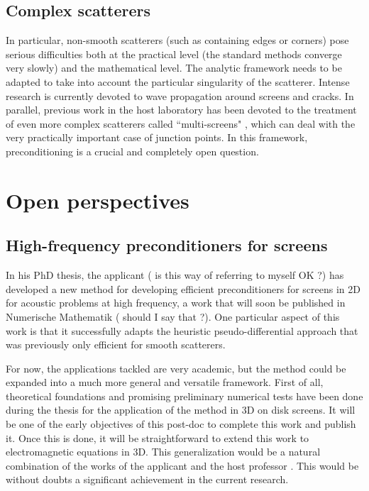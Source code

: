 \documentclass[]{article}
\begin{document}
\subsection*{Complex scatterers}

In particular, non-smooth scatterers (such as containing edges or corners) pose serious difficulties both at the practical level (the standard methods converge very slowly) and the mathematical level. The analytic framework needs to be adapted to take into account the particular singularity of the scatterer. Intense research is currently devoted to wave propagation around screens and cracks. In parallel, previous work in the host laboratory has been devoted to the treatment of even more complex scatterers called ``multi-screens" \cite{claeys2013integral,claeys2020quotient}, which can deal with the very practically important case of junction points. In this framework, preconditioning is a crucial and completely open question.  

 
\section{Open perspectives}

\subsection*{High-frequency preconditioners for screens}

In his PhD thesis, the applicant ({\color{red} is this way of referring to myself OK ?}) has developed a new method for developing efficient preconditioners for screens in 2D for acoustic problems at high frequency, a work that will soon be published in Numerische Mathematik ({\color{red} should I say that ?}). One particular aspect of this work is that it successfully adapts the heuristic pseudo-differential approach that was previously only efficient for smooth scatterers. 

For now, the applications tackled are very academic, but the method could be expanded into a much more general and versatile framework. First of all, theoretical foundations and promising preliminary numerical tests have been done during the thesis for the application of the method in 3D on disk screens. It will be one of the early objectives of this post-doc to complete this work and publish it. Once this is done, it will be straightforward to extend this work to electromagnetic equations in 3D. This generalization would be a natural combination of the works of the applicant and the host professor \cite{hiptmair2019preconditioning}. This would be without doubts a significant achievement in the current research. 
\end{document}
